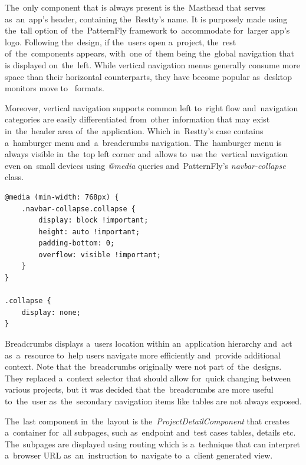 The~only component that is always present is the~Masthead that serves as~an~app's header, containing
the~Restty's name. It is purposely made using the~tall option of~the~PatternFly framework to~accommodate
for~larger app's logo. Following the~design, if the~users open a~project, the~rest of~the~components appears, 
with~one of~them being the~global navigation that is displayed on~the~left. While vertical navigation menus
generally consume more space than their horizontal counterparts, they have become popular as~desktop monitors
move to~ formats. 

Moreover, vertical navigation supports common left to~right flow
and~navigation categories are easily differentiated from~other information that may exist in~the~header area
of~the~application. Which in~Restty's case contains a~hamburger menu and~a~breadcrumbs navigation. 
The~hamburger menu is always visible in~the~top left corner and~allows to~use the~vertical navigation even
on~small devices using \textit{@media} queries and~PatternFly's \textit{navbar-collapse} class.

\vspace{1mm}
\begin{lstlisting}[caption=Media queries on the .navbar-collapse class that enables the~navbar
to~work even on~small devices., style=dp-default]
@media (min-width: 768px) {
	.navbar-collapse.collapse {
		display: block !important;
		height: auto !important;
		padding-bottom: 0;
		overflow: visible !important;
	}
}

.collapse {
	display: none;
}
\end{lstlisting}

Breadcrumbs displays a~users location within an~application hierarchy and~act as~a~resource to~help users navigate more
efficiently and~provide additional context. Note that the~breadcrumbs originally were not part of~the~designs. They
replaced a~context selector that should allow for~quick changing between various projects, but it was decided that
the~breadcrumbs are more useful to~the~user as~the~secondary navigation items like tables are not always exposed.

The~last component in~the~layout is the~\textit{ProjectDetailComponent} that creates a~container for~all subpages,
such as~endpoint and~test cases tables, details etc. The~subpages are displayed using routing which is a~technique
that can interpret a~browser URL as~an~instruction to~navigate to~a~client generated view.

